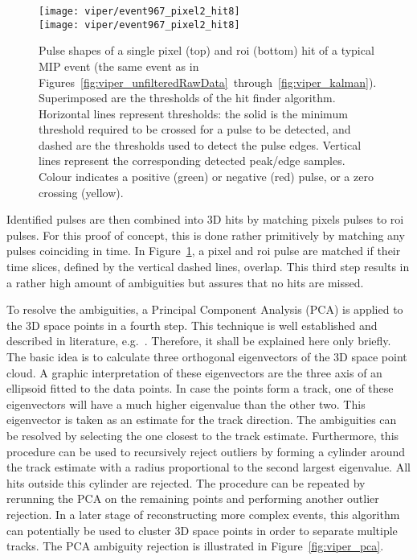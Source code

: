 \begin{figure}[htb]
	\centering
	\texttt{[image: viper/event967\_pixel2\_hit8]}\\
	\texttt{[image: viper/event967\_pixel2\_hit8]}
	\caption{Pulse shapes of a single pixel (top) and \gls{roi} (bottom) hit of a typical MIP event (the same event as in Figures~\ref{fig:viper_unfilteredRawData}~through~\ref{fig:viper_kalman}).
	Superimposed are the thresholds of the hit finder algorithm. Horizontal lines represent thresholds: the solid is the minimum threshold required to be crossed for a pulse to be detected, and dashed are the thresholds used to detect the pulse edges.
	Vertical lines represent the corresponding detected peak/edge samples.
	Colour indicates a positive (green) or negative (red) pulse, or a zero crossing (yellow).}
	\label{fig:viper_hitFinder}
\end{figure}

Identified pulses are then combined into 3D hits by matching pixels pulses to \gls{roi} pulses.
For this proof of concept, this is done rather primitively by matching any pulses coinciding in time.
In Figure~\ref{fig:viper_hitFinder}, a pixel and \gls{roi} pulse are matched if their time slices, defined by the vertical dashed lines, overlap.
This third step results in a rather high amount of ambiguities but assures that no hits are missed.

To resolve the ambiguities, a Principal Component Analysis (PCA) is applied to the 3D space points in a fourth step.
This technique is well established and described in literature, e.g.~\cite{pca}.
Therefore, it shall be explained here only briefly.
The basic idea is to calculate three orthogonal eigenvectors of the 3D space point cloud.
A graphic interpretation of these eigenvectors are the three axis of an ellipsoid fitted to the data points.
In case the points form a track, one of these eigenvectors will have a much higher eigenvalue than the other two.
This eigenvector is taken as an estimate for the track direction.
The ambiguities can be resolved by selecting the one closest to the track estimate.
Furthermore, this procedure can be used to recursively reject outliers by forming a cylinder around the track estimate with a radius proportional to the second largest eigenvalue.
All hits outside this cylinder are rejected.
The procedure can be repeated by rerunning the PCA on the remaining points and performing another outlier rejection.
In a later stage of reconstructing more complex events, this algorithm can potentially be used to cluster 3D space points in order to separate multiple tracks.
The PCA ambiguity rejection is illustrated in Figure~\ref{fig:viper_pca}.

